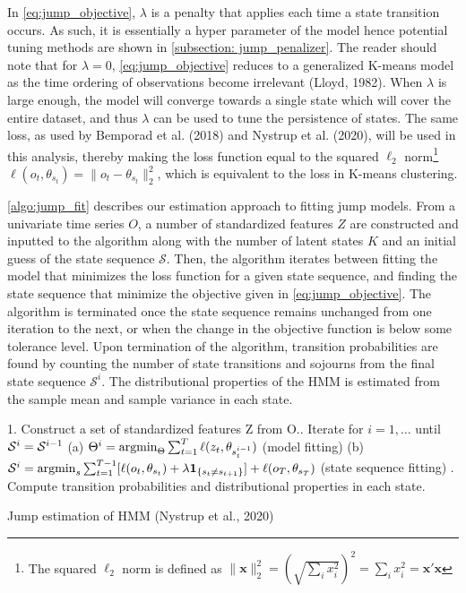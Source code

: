 In \cref{eq:jump_objective}, $\lambda$ is a penalty that applies each time a state transition occurs. As such, it is essentially a hyper parameter of the model hence potential tuning methods are shown in \cref{subsection: jump_penalizer}. The reader should note that for $\lambda=0$, \cref{eq:jump_objective} reduces to a generalized K-means model as the time ordering of observations become irrelevant (Lloyd, 1982). When $\lambda$ is large enough, the model will converge towards a single state which will cover the entire dataset, and thus $\lambda$ can be used to tune the persistence of states. The same loss, as used by Bemporad et al. (2018) and Nystrup et al. (2020), will be used in this analysis, thereby making the loss function equal to the squared $\ell_2$ norm\footnote{The squared $\ell_2$ norm is defined as $\|\mathbf{x}\|_2^2 = (\sqrt{\sum_i x_i^2})^2 = \sum_i x_i^2 = \mathbf{x'x} $} $\ell(o_t, \theta_{s_t}) = \| o_t - \theta_{s_t} \|_2^2$, which is equivalent to the loss in K-means clustering.

\cref{algo:jump_fit} describes our estimation approach to fitting jump models. From a univariate time series $O$, a number of standardized features $Z$ are constructed and inputted to the algorithm along with the number of latent states $K$ and an initial guess of the state sequence $\mathcal{S}$. Then, the algorithm iterates between fitting the model that minimizes the loss function for a given state sequence, and finding the state sequence that minimize the objective given in \cref{eq:jump_objective}. The algorithm is terminated once the state sequence remains unchanged from one iteration to the next, or when the change in the objective function is below some tolerance level. Upon termination of the algorithm, transition probabilities are found by counting the number of state transitions and sojourns from the final state sequence $\mathcal{S}^i$. The distributional properties of the HMM is estimated from the sample mean and sample variance in each state.

\begin{algorithm}[H]
\BlankLine

1. Construct a set of standardized features Z from O.. Iterate for $i=1,\ldots$ until $\S^i=\S^{i-1}$ \;
\Indp
(a) $\Theta^i = \argmin_{\Theta} \sum_{t=1}^T \ell(z_t, \theta_{s_t^{i-1}})$ (model fitting)\;
(b) $\S^i = \argmin_s \sum_{t=1}^{T-1} [\ell(o_t, \theta_{s_t}) + \lambda\mathbf{1}_{\{ s_t\ne s_{t+1} \}}]
    + \ell(o_T, \theta_{s_T})$ (state sequence fitting)\;
. Compute transition probabilities and distributional properties in each state.\;
\BlankLine
{}

\caption{Jump estimation of HMM (Nystrup et al., 2020)}
\label{algo:jump_fit}
\end{algorithm}

